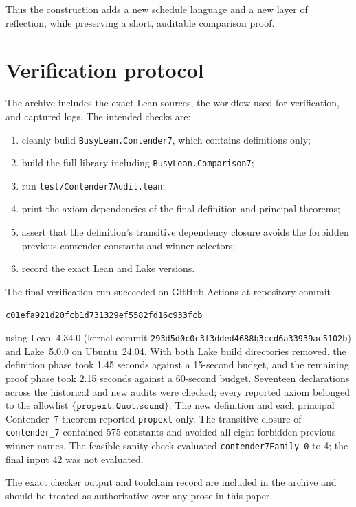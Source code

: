 \documentclass[11pt]{article}
\theoremstyle{definition}
\theoremstyle{remark}
\newcommand{\lean}[1]{\texttt{#1}}
\begin{document}
Thus the construction adds a new schedule language and a new layer of
reflection, while preserving a short, auditable comparison proof.

\section{Verification protocol}

The archive includes the exact Lean sources, the workflow used for verification,
and captured logs.  The intended checks are:

\begin{enumerate}[leftmargin=*]
\item cleanly build \lean{BusyLean.Contender7}, which contains definitions only;
\item build the full library including \lean{BusyLean.Comparison7};
\item run \lean{test/Contender7Audit.lean};
\item print the axiom dependencies of the final definition and principal
  theorems;
\item assert that the definition's transitive dependency closure avoids the
  forbidden previous contender constants and winner selectors;
\item record the exact Lean and Lake versions.
\end{enumerate}

The final verification run succeeded on GitHub Actions at repository commit
\begin{center}
\lean{c01efa921d20fcb1d731329ef5582fd16c933fcb}
\end{center}
using Lean~4.34.0 (kernel commit
\lean{293d5d0c0c3f3dded4688b3ccd6a33939ac5102b}) and Lake~5.0.0 on
Ubuntu~24.04.  With both Lake build directories removed, the definition phase
took 1.45 seconds against a 15-second budget, and the remaining proof phase took
2.15 seconds against a 60-second budget.  Seventeen declarations across the
historical and new audits were checked; every reported axiom belonged to the
allowlist $\{\lean{propext},\lean{Quot.sound}\}$.  The new definition and each
principal Contender~7 theorem reported \lean{propext} only.  The transitive
closure of \lean{contender\_7} contained 575 constants and avoided all eight
forbidden previous-winner names.  The feasible sanity check evaluated
\lean{contender7Family 0} to 4; the final input 42 was not evaluated.

The exact checker output and toolchain record are included in the archive and
should be treated as authoritative over any prose in this paper.
\end{document}
